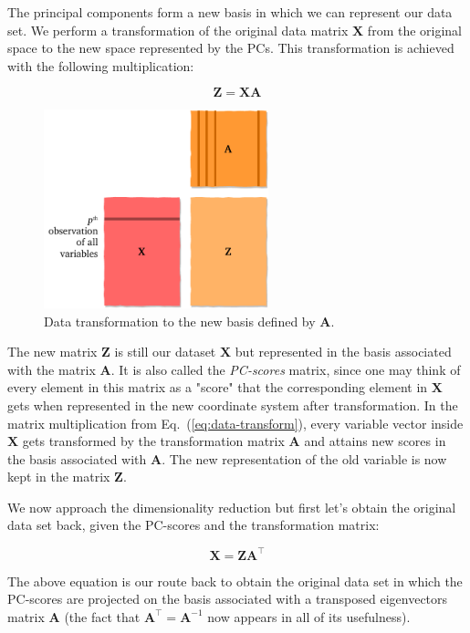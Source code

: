 \documentclass[10pt,twocolumn]{article}
\begin{document}
The principal components form a new basis in which we can represent our data set. We perform a transformation of the original data matrix $\mathbf{X}$ from the original space to the new space represented by the PCs. This transformation is achieved with the following multiplication:

\begin{equation} \label{eq:data-transform}
\mathbf{Z} = \mathbf{X} \mathbf{A}
\end{equation}

\begin{figure}[H]
\centering\includegraphics[width=6.5cm]{data-transformation.pdf}
\caption{Data transformation to the new basis defined by $\mathbf{A}$.}
\label{fig:data-transformation}
\end{figure}

The new matrix $\mathbf{Z}$ is still our dataset $\mathbf{X}$ but represented in the basis associated with the matrix $\mathbf{A}$. It is also called the \textit{PC-scores} matrix, since one may think of every element in this matrix as a "score" that the corresponding element in $\mathbf{X}$ gets when represented in the new coordinate system after transformation. In the matrix multiplication from Eq.~(\ref{eq:data-transform}), every variable vector inside $\mathbf{X}$ gets transformed by the transformation matrix $\mathbf{A}$ and attains new scores in the basis associated with $\mathbf{A}$. The new representation of the old variable is now kept in the matrix $\mathbf{Z}$.



We now approach the dimensionality reduction but first let's obtain the original data set back, given the PC-scores and the transformation matrix:

\begin{equation} \label{eq:X-retrieval}
\mathbf{X} = \mathbf{Z} \mathbf{A}^{\top}
\end{equation}

The above equation is our route back to obtain the original data set in which the PC-scores are projected on the basis associated with a transposed eigenvectors matrix $\mathbf{A}$ (the fact that $\mathbf{A}^{\top} = \mathbf{A}^{-1}$ now appears in all  of its usefulness).
\end{document}
